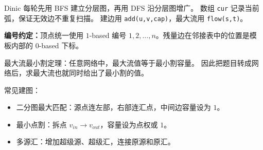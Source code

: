 Dinic 每轮先用 BFS 建立分层图，再用 DFS 沿分层图增广。
数组 \texttt{cur} 记录当前弧，保证无效边不重复扫描。
建边用 \texttt{add(u,v,cap)}，最大流用 \texttt{flow(s,t)}。

\textbf{编号约定：}顶点统一使用 $1$-based 编号 $1,2,\ldots,n$。残量边在邻接表中的位置是模板内部的 $0$-based 下标。

最大流最小割定理：任意网络中，最大流值等于最小割容量。
因此把题目转成网络后，求最大流也就同时给出了最小割的值。

常见建图：

\begin{itemize}
  \item 二分图最大匹配：源点连左部，右部连汇点，中间边容量设为 $1$。
  \item 最小点割：拆点 $v_{in}\to v_{out}$，容量设为点权或 $1$。
  \item 多源汇：增加超级源、超级汇，连接原源和原汇。
\end{itemize}
